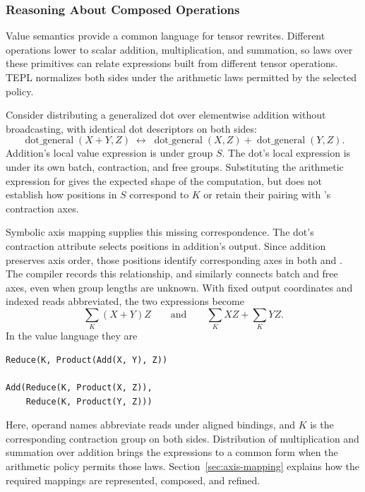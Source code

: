 \FloatBarrier
\subsubsection{Reasoning About Composed Operations}
\label{sec:composition}
Value semantics provide a common language for tensor rewrites. Different
operations lower to scalar addition, multiplication, and summation, so laws
over these primitives can relate expressions built from different tensor
operations. TEPL normalizes both sides under the arithmetic laws permitted
by the selected policy.

Consider distributing a generalized dot over elementwise addition without
broadcasting, with identical dot descriptors on both sides:
\begin{equation}
 \operatorname{dot\_general}(X+Y,Z)
 \;\longleftrightarrow\;
 \operatorname{dot\_general}(X,Z)+\operatorname{dot\_general}(Y,Z).
\end{equation}
Addition's local value expression is  under group $S$.
The dot's local expression is  under its own
batch, contraction, and free groups. Substituting the arithmetic expression
for  gives the expected shape of the computation, but does not
establish how positions in $S$ correspond to $K$ or retain their pairing with
's contraction axes.

Symbolic axis mapping supplies this missing correspondence. The dot's
contraction attribute selects positions in addition's output. Since addition
preserves axis order, those positions identify corresponding axes in both
 and . The compiler records this relationship, and similarly
connects batch and free axes, even when group lengths are unknown. With fixed
output coordinates and indexed reads abbreviated, the two expressions become
\begin{equation}
 \sum_K(X+Y)Z
 \qquad\text{and}\qquad
 \sum_K XZ+\sum_K YZ.
\end{equation}
In the value language they are
\begin{codeblock}[H]
\begin{lstlisting}[language=TEPL]
Reduce(K, Product(Add(X, Y), Z))

Add(Reduce(K, Product(X, Z)),
    Reduce(K, Product(Y, Z)))
\end{lstlisting}
\end{codeblock}
Here, operand names abbreviate reads under aligned bindings, and $K$ is the
corresponding contraction group on both sides. Distribution of multiplication
and summation over addition brings the expressions to a common form when
the arithmetic policy permits those laws. Section~\ref{sec:axis-mapping}
explains how the required mappings are represented, composed, and refined.
